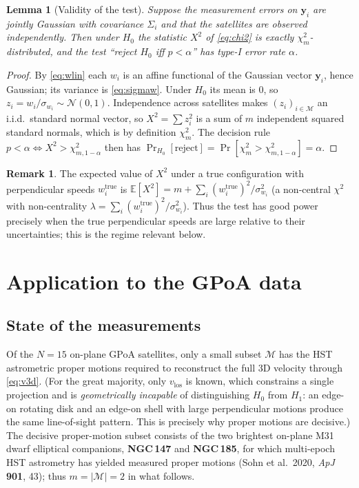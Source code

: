 \documentclass{amsart}
\newtheorem{lemma}{Lemma}
\theoremstyle{definition}
\newtheorem{remark}{Remark}
\begin{document}
\begin{lemma}[Validity of the test]\label{lem:valid}
Suppose the measurement errors on $\bm y_i$ are jointly Gaussian with
covariance $\Sigma_i$ and that the satellites are observed independently.
Then under $H_0$ the statistic $X^2$ of \eqref{eq:chi2} is exactly
$\chi^2_m$-distributed, and the test ``reject $H_0$ iff $p<\alpha$'' has
type-I error rate $\alpha$.
\end{lemma}
\begin{proof}
By \eqref{eq:wlin} each $w_i$ is an affine functional of the Gaussian vector
$\bm y_i$, hence Gaussian; its variance is \eqref{eq:sigmaw}. Under $H_0$
its mean is $0$, so $z_i=w_i/\sigma_{w_i}\sim\mathcal N(0,1)$. Independence
across satellites makes $(z_i)_{i\in\mathcal M}$ an i.i.d.\ standard normal
vector, so $X^2=\sum z_i^2$ is a sum of $m$ independent squared standard
normals, which is by definition $\chi^2_m$. The decision rule
$p<\alpha\Leftrightarrow X^2>\chi^2_{m,1-\alpha}$ then has
$\Pr_{H_0}[\text{reject}]=\Pr[\chi^2_m>\chi^2_{m,1-\alpha}]=\alpha$.
\end{proof}

\begin{remark}\label{rem:power}
The expected value of $X^2$ under a true configuration with perpendicular
speeds $w_i^{\mathrm{true}}$ is
$\mathbb E[X^2]=m+\sum_{i}(w_i^{\mathrm{true}})^2/\sigma_{w_i}^2$ (a
non-central $\chi^2$ with non-centrality
$\lambda=\sum_i (w_i^{\mathrm{true}})^2/\sigma_{w_i}^2$). Thus the test has
good power precisely when the true perpendicular speeds are large relative
to their uncertainties; this is the regime relevant below.
\end{remark}

\section{Application to the GPoA data}

\subsection{State of the measurements}
Of the $N=15$ on-plane GPoA satellites, only a small subset $\mathcal M$ has
the HST astrometric proper motions required to reconstruct the full 3D
velocity through \eqref{eq:v3d}. (For the great majority, only
$v_{\mathrm{los}}$ is known, which constrains a single projection and is
\emph{geometrically incapable} of distinguishing $H_0$ from $H_1$: an
edge-on rotating disk and an edge-on shell with large perpendicular motions
produce the same line-of-sight pattern. This is precisely why proper
motions are decisive.) The decisive proper-motion subset consists of the two
brightest on-plane M31 dwarf elliptical companions, \textbf{NGC\,147} and
\textbf{NGC\,185}, for which multi-epoch HST astrometry has yielded measured
proper motions (Sohn et al.\ 2020, \emph{ApJ} \textbf{901}, 43); thus
$m=|\mathcal M|=2$ in what follows.
\end{document}
